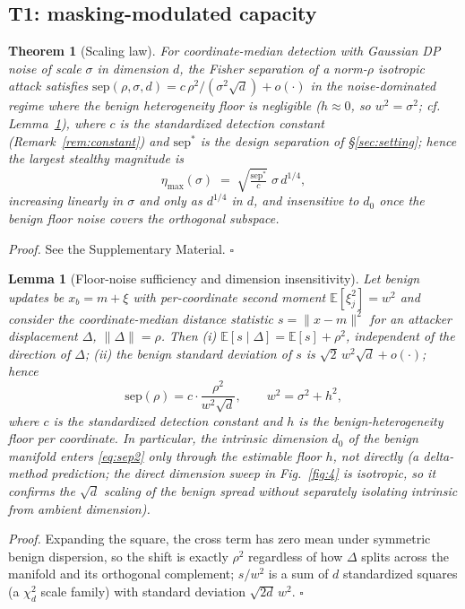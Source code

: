 \documentclass[final,1p,times]{elsarticle}
\newtheorem{theorem}{Theorem}
\newtheorem{lemma}{Lemma}
\begin{document}
\subsection{T1: masking-modulated capacity}
\begin{theorem}[Scaling law]\label{thm:t1}
For coordinate-median detection with Gaussian DP noise of scale
$\sigma$ in dimension $d$, the Fisher separation of a norm-$\rho$
isotropic attack satisfies
$\mathrm{sep}(\rho,\sigma,d)=c\,\rho^2/(\sigma^2\sqrt{d})+o(\cdot)$ in the
noise-dominated regime where the benign heterogeneity floor is
negligible ($h\approx0$, so $w^2=\sigma^2$; cf. Lemma~\ref{lem:floor}),
where $c$ is the standardized detection constant
(Remark~\ref{rem:constant}) and $\mathrm{sep}^{*}$ is the design
separation of \S\ref{sec:setting}; hence the largest stealthy magnitude
is
\begin{equation}
  \eta_{\max}(\sigma)\;=\;\sqrt{\tfrac{\mathrm{sep}^{*}}{c}}\;\sigma\, d^{1/4},
  \label{eq:etamax}
\end{equation}
increasing linearly in $\sigma$ and only as $d^{1/4}$ in $d$, and
insensitive to $d_0$ once the benign floor noise covers the orthogonal
subspace.
\end{theorem}
\emph{Proof.} See the Supplementary Material. \hfill$\square$

\begin{lemma}[Floor-noise sufficiency and dimension insensitivity]
\label{lem:floor}
Let benign updates be $x_b=m+\xi$ with per-coordinate second moment
$\mathbb{E}[\xi_j^2]=w^2$ and consider the coordinate-median distance
statistic $s=\|x-m\|^2$ for an attacker displacement $\Delta$,
$\|\Delta\|=\rho$. Then (i)
$\mathbb{E}[s\mid\Delta]=\mathbb{E}[s]+\rho^2$, \emph{independent of
the direction of $\Delta$}; (ii) the benign standard deviation of $s$
is $\sqrt{2}\,w^2\sqrt{d}+o(\cdot)$; hence
\begin{equation}
  \mathrm{sep}(\rho)=c\cdot\frac{\rho^2}{w^2\sqrt{d}},
  \qquad w^2=\sigma^2+h^2,
  \label{eq:sep2}
\end{equation}
where $c$ is the standardized detection constant and $h$ is the
benign-heterogeneity floor per coordinate. In particular, the
intrinsic dimension $d_0$ of the benign manifold enters \eqref{eq:sep2}
only through the estimable floor $h$, not directly (a delta-method
prediction; the direct dimension sweep in Fig.~\ref{fig:4} is isotropic,
so it confirms the $\sqrt{d}$ scaling of the benign spread without
separately isolating intrinsic from ambient dimension).
\end{lemma}
\emph{Proof.} Expanding the square, the cross term has zero mean under
symmetric benign dispersion, so the shift is exactly $\rho^2$
regardless of how $\Delta$ splits across the manifold and its
orthogonal complement; $s/w^2$ is a sum of $d$ standardized squares
(a $\chi^2_d$ scale family) with standard deviation $\sqrt{2d}\,w^2$.
\hfill$\square$
\end{document}
